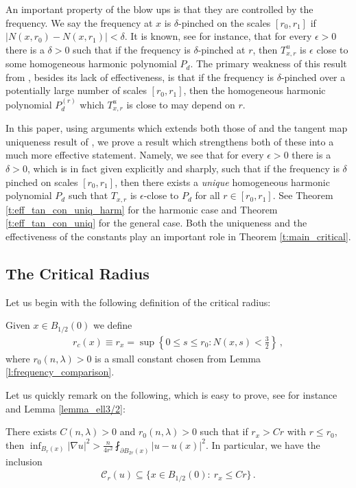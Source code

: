 \documentclass[11pt]{article}
\begin{document}
An important property of the blow ups is that they are controlled by the frequency.  We say the frequency at $x$ is $\delta$-pinched on the scales $[r_0,r_1]$ if $|N(x,r_0)-N(x,r_1)|<\delta$.  It is known, see \cite{chnava} for instance, that for every $\epsilon>0$ there is a $\delta>0$ such that if the frequency is $\delta$-pinched at $r$, then $T^u_{x,r}$ is $\epsilon$ close to some homogeneous harmonic polynomial $P_d$.  The primary weakness of this result from \cite{chnava}, besides its lack of effectiveness, is that if the frequency is $\delta$-pinched over a potentially large number of scales $[r_0,r_1]$, then the homogeneous harmonic polynomial $P^{(r)}_d$ which $T^u_{x,r}$ is close to may depend on $r$.  

In this paper, using arguments which extends both those of \cite{chnava} and the tangent map uniqueness result of \cite{han_sing}, we prove a result which strengthens both of these into a much more effective statement.  Namely, we see that for every $\epsilon>0$ there is a $\delta>0$, which is in fact given explicitly and sharply, such that if the frequency is $\delta$ pinched on scales $[r_0,r_1]$, then there exists a {\it unique} homogeneous harmonic polynomial $P_d$ such that $T_{x,r}$ is $\epsilon$-close to $P_d$ for all $r\in [r_0,r_1]$.  See Theorem \ref{t:eff_tan_con_uniq_harm} for the harmonic case and Theorem \ref{t:eff_tan_con_uniq} for the general case.  Both the uniqueness and the effectiveness of the constants play an important role in Theorem \ref{t:main_critical}.

\subsection{The Critical Radius}\label{ss:critical_radius}

Let us begin with the following definition of the critical radius:
\begin{definition}
 Given $x\in B_{1/2}(0)$ we define
 \begin{gather}
  r_c(x)\equiv r_x = \sup{\left\{{0\leq s\leq r_0:  N(x,s)<\frac{3}{2}}\right\}} \, ,
 \end{gather}
 where $r_0(n,\lambda)>0$ is a small constant chosen from Lemma \ref{l:frequency_comparison}.
\end{definition}

Let us quickly remark on the following, which is easy to prove, see for instance \cite{chnava} and Lemma \ref{lemma_ell3/2}:

\begin{lemma}\label{l:frequency_comparison}
There exists $C(n,\lambda)>0$ and $r_0(n,\lambda)>0$ such that if $r_x>Cr$ with $r\leq r_0$, then $\inf_{B_r(x)}|\nabla u|^2 > \frac{n}{4r^2}\fint_{\partial B_{2r}(x)} |u-u(x)|^2$.  In particular, we have the inclusion
\begin{align}
{\mathcal{C}}_r(u)\subseteq\{x\in B_{1/2}(0):\ r_x\leq Cr\}\, .
\end{align}
\end{lemma}
\end{document}
